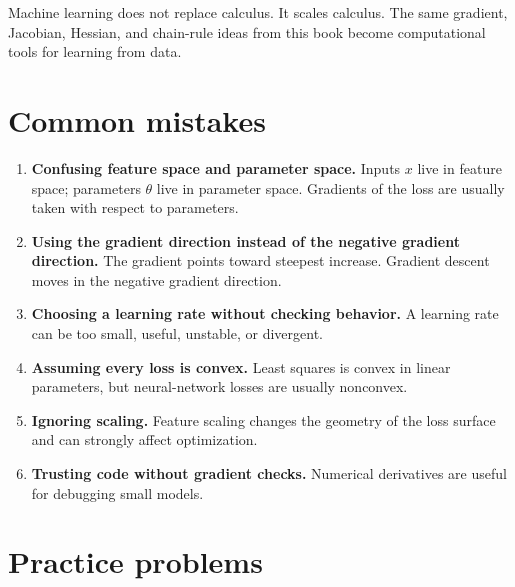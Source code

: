 \documentclass[11pt,oneside]{book}
\begin{document}
\begin{summarybox}
Machine learning does not replace calculus. It scales calculus. The same gradient, Jacobian, Hessian, and chain-rule ideas from this book become computational tools for learning from data.
\end{summarybox}

\section{Common mistakes}

\begin{warningbox}
\begin{enumerate}
  \item \textbf{Confusing feature space and parameter space.} Inputs $x$ live in feature space; parameters $\theta$ live in parameter space. Gradients of the loss are usually taken with respect to parameters.
  \item \textbf{Using the gradient direction instead of the negative gradient direction.} The gradient points toward steepest increase. Gradient descent moves in the negative gradient direction.
  \item \textbf{Choosing a learning rate without checking behavior.} A learning rate can be too small, useful, unstable, or divergent.
  \item \textbf{Assuming every loss is convex.} Least squares is convex in linear parameters, but neural-network losses are usually nonconvex.
  \item \textbf{Ignoring scaling.} Feature scaling changes the geometry of the loss surface and can strongly affect optimization.
  \item \textbf{Trusting code without gradient checks.} Numerical derivatives are useful for debugging small models.
\end{enumerate}
\end{warningbox}

\section{Practice problems}
\end{document}
